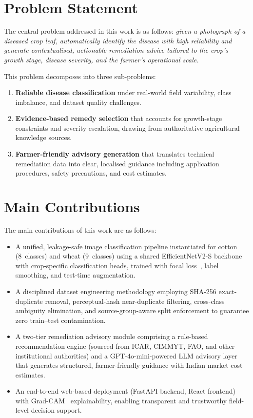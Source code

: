 \documentclass[12pt,a4paper]{report}
\begin{document}
\section{Problem Statement}
The central problem addressed in this work is as follows: \textit{given a photograph of a diseased crop leaf, automatically identify the disease with high reliability and generate contextualised, actionable remediation advice tailored to the crop's growth stage, disease severity, and the farmer's operational scale.}

This problem decomposes into three sub-problems:
\begin{enumerate}
    \item \textbf{Reliable disease classification} under real-world field variability, class imbalance, and dataset quality challenges.
    \item \textbf{Evidence-based remedy selection} that accounts for growth-stage constraints and severity escalation, drawing from authoritative agricultural knowledge sources.
    \item \textbf{Farmer-friendly advisory generation} that translates technical remediation data into clear, localised guidance including application procedures, safety precautions, and cost estimates.
\end{enumerate}

\section{Main Contributions}
The main contributions of this work are as follows:
\begin{itemize}
    \item A unified, leakage-safe image classification pipeline instantiated for cotton (8~classes) and wheat (9~classes) using a shared EfficientNetV2-S backbone~\cite{b1} with crop-specific classification heads, trained with focal loss~\cite{b2}, label smoothing, and test-time augmentation.
    \item A disciplined dataset engineering methodology employing SHA-256 exact-duplicate removal, perceptual-hash near-duplicate filtering, cross-class ambiguity elimination, and source-group-aware split enforcement to guarantee zero train--test contamination.
    \item A two-tier remediation advisory module comprising a rule-based recommendation engine (sourced from ICAR, CIMMYT, FAO, and other institutional authorities) and a GPT-4o-mini-powered LLM advisory layer that generates structured, farmer-friendly guidance with Indian market cost estimates.
    \item An end-to-end web-based deployment (FastAPI backend, React frontend) with Grad-CAM~\cite{b3} explainability, enabling transparent and trustworthy field-level decision support.
\end{itemize}
\end{document}
